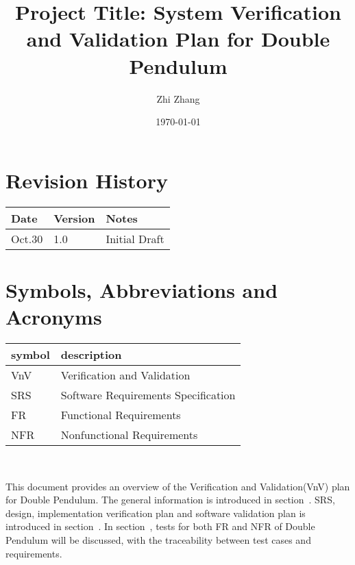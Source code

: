 \documentclass[12pt, titlepage]{article}
\begin{document}
\title{Project Title: System Verification and Validation Plan for Double Pendulum} 
\author{Zhi Zhang}
\date{\today}
	
\maketitle


\section{Revision History}

\begin{tabularx}{\textwidth}{p{3cm}p{2cm}X}
\toprule {\bf Date} & {\bf Version} & {\bf Notes}\\
\midrule
Oct.30 & 1.0 & Initial Draft\\

\bottomrule
\end{tabularx}

\newpage

\tableofcontents

\listoftables

\listoffigures

\newpage

\section{Symbols, Abbreviations and Acronyms}

\renewcommand{\arraystretch}{1.2}
\begin{tabular}{l l} 
  \toprule		
  \textbf{symbol} & \textbf{description}\\
  \midrule 
  VnV & Verification and Validation\\
  SRS & Software Requirements Specification\\
  FR & Functional Requirements\\
  NFR & Nonfunctional Requirements\\
  \bottomrule
\end{tabular}\\

\newpage


This document provides an overview of the Verification and Validation(VnV) plan for Double Pendulum. The general information is introduced in section~. SRS, design, implementation verification plan and software validation plan is introduced in section~. In section~, tests for both FR and NFR of Double Pendulum will be discussed, with the traceability between test cases and requirements. 
\end{document}
